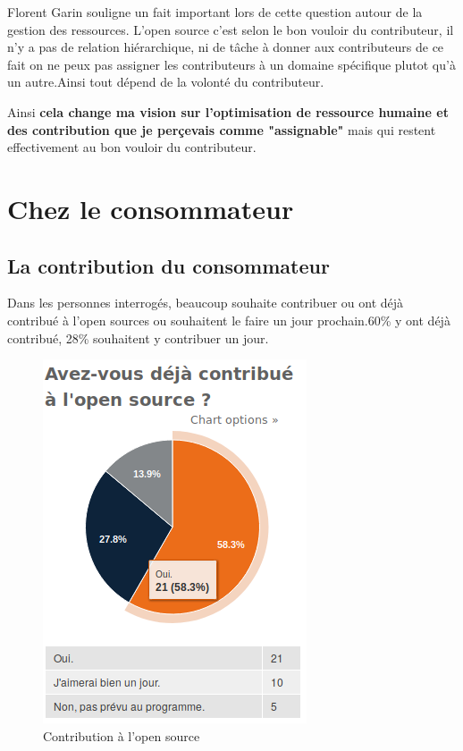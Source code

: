 			\newpage

			Florent Garin souligne un fait important lors de cette question autour de la gestion des ressources.
			L'open source c'est selon le bon vouloir du contributeur, il n'y a pas de relation hiérarchique, ni de tâche à donner aux contributeurs de ce fait on ne peux pas assigner les contributeurs à un domaine spécifique plutot qu'à un autre.Ainsi tout dépend de la volonté du contributeur.

			\begin{center}
				\textit{
				}
			\end{center}

			Ainsi \textbf{cela change ma vision sur l'optimisation de ressource humaine et des contribution que je perçevais comme "assignable"} mais qui restent effectivement au bon vouloir du contributeur.

	\section{Chez le consommateur}

		\subsection{La contribution du consommateur}

			Dans les personnes interrogés, beaucoup souhaite contribuer ou ont déjà contribué à l'open sources ou souhaitent le faire un jour prochain.60\% y ont déjà contribué, 28\% souhaitent y contribuer un jour.

			\begin{figure}[!htb]
				\center
				\includegraphics[scale=0.58]{./img/a4}
				\caption{Contribution à l'open source}
			\end{figure}


